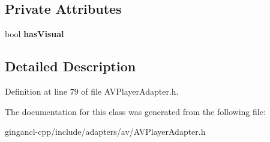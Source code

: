 \subsection*{Private Attributes}
\begin{CompactItemize}
\item 
bool {\bf hasVisual}\label{classbr_1_1pucrio_1_1telemidia_1_1ginga_1_1ncl_1_1adapters_1_1av_1_1AVPlayerAdapter_0a54acb712166416fc704e7fedf96d1e}

\end{CompactItemize}


\subsection{Detailed Description}




Definition at line 79 of file AVPlayerAdapter.h.

The documentation for this class was generated from the following file:\begin{CompactItemize}
\item 
gingancl-cpp/include/adapters/av/AVPlayerAdapter.h\end{CompactItemize}
